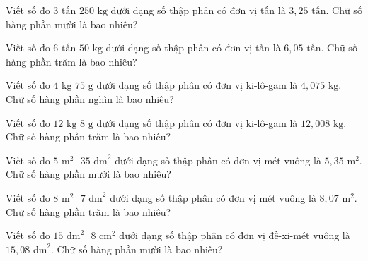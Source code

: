 \begin{ex}
  Viết số đo $3\text{ tấn } 250\text{ kg}$ dưới dạng số thập phân có đơn vị tấn là $3{,}25\text{ tấn}$. Chữ số hàng phần mười là bao nhiêu?
\end{ex}

\begin{ex}
  Viết số đo $6\text{ tấn } 50\text{ kg}$ dưới dạng số thập phân có đơn vị tấn là $6{,}05\text{ tấn}$. Chữ số hàng phần trăm là bao nhiêu?
\end{ex}

\begin{ex}
  Viết số đo $4\text{ kg } 75\text{ g}$ dưới dạng số thập phân có đơn vị ki-lô-gam là $4{,}075\text{ kg}$. Chữ số hàng phần nghìn là bao nhiêu?
\end{ex}

\begin{ex}
  Viết số đo $12\text{ kg } 8\text{ g}$ dưới dạng số thập phân có đơn vị ki-lô-gam là $12{,}008\text{ kg}$. Chữ số hàng phần trăm là bao nhiêu?
\end{ex}

\begin{ex}
  Viết số đo $5\text{ m}^2\text{ } 35\text{ dm}^2$ dưới dạng số thập phân có đơn vị mét vuông là $5{,}35\text{ m}^2$. Chữ số hàng phần mười là bao nhiêu?
\end{ex}

\begin{ex}
  Viết số đo $8\text{ m}^2\text{ } 7\text{ dm}^2$ dưới dạng số thập phân có đơn vị mét vuông là $8{,}07\text{ m}^2$. Chữ số hàng phần trăm là bao nhiêu?
\end{ex}

\begin{ex}
  Viết số đo $15\text{ dm}^2\text{ } 8\text{ cm}^2$ dưới dạng số thập phân có đơn vị đề-xi-mét vuông là $15{,}08\text{ dm}^2$. Chữ số hàng phần mười là bao nhiêu?
\end{ex}


